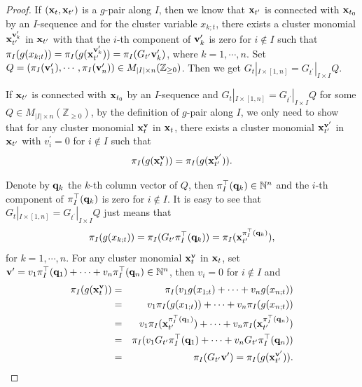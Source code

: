 \documentclass[14pt]{amsart}
\begin{document}
\begin{proof}

If $({\bf x}_t,{\bf x}_{t^\prime})$ is a $g$-pair along $I$, then we know that  ${\bf x}_{t^\prime}$ is connected with ${\bf x}_{t_0}$ by an $I$-sequence and
for the cluster variable $x_{k;t}$, there exists a cluster monomial ${\bf x}_{t^{\prime}}^{{\bf v}_k^{\prime}}$ in ${\bf x}_{t^{\prime}}$ with that the $i$-th component of ${\bf v}_k^{\prime}$ is zero  for $i\notin I$
  such that $\pi_I(g(x_{k;t}))=\pi_I(g({\bf x}_{t^{\prime}}^{{\bf v}_k^{\prime}}))=\pi_I(G_{t^\prime}{\bf v}_k^\prime)$, where $k=1,\cdots,n$. Set $Q=(\pi_I({\bf v}_1^\prime),\cdots,\pi_I({\bf v}_n^\prime))\in M_{|I|\times n}(\mathbb Z_{\geq 0})$.
  Then we get $G_t|_{I\times [1,n]}=G_{t^\prime}|_{I\times I}Q$.


  If ${\bf x}_{t^\prime}$ is connected with ${\bf x}_{t_0}$ by an $I$-sequence and
 $G_t|_{I\times [1,n]}=G_{t^\prime}|_{I\times I}Q$ for some $Q\in M_{|I|\times n}(\mathbb Z_{\geq 0})$, by the definition of $g$-pair along $I$, we only need to show that for any cluster monomial ${\bf x}_t^{\bf v}$ in ${\bf x}_t$, there exists a cluster monomial ${\bf x}_{t^{\prime}}^{{\bf v}^{\prime}}$ in ${\bf x}_{t^{\prime}}$ with $v_i^{\prime}=0$ for $i\notin I$
  such that
$$\pi_I(g({\bf x}_t^{\bf v}))=\pi_I(g({\bf x}_{t^{\prime}}^{{\bf v}^{\prime}})).$$



  Denote by ${\bf q}_k$ the $k$-th column vector of $Q$, then $\pi_I^\top({\bf q}_k)\in\mathbb N^n$ and the $i$-th component of $\pi_I^\top({\bf q}_k)$ is zero for $i\notin I$.
  It is easy to see that $G_t|_{I\times [1,n]}=G_{t^\prime}|_{I\times I}Q$  just means that
  $$\pi_I(g(x_{k;t}))=\pi_I(G_{t^\prime} \pi_I^\top({\bf q}_k))=\pi_I({\bf x}_{t^\prime}^{\pi_I^\top({\bf q}_k)}),$$
  for $k=1,\cdots,n$. For any cluster monomial  ${\bf x}_t^{\bf v}$ in ${\bf x}_t$, set ${\bf v}^\prime=v_1\pi_I^\top({\bf q}_1)+\cdots+v_n\pi_I^\top({\bf q}_n)\in\mathbb N^n$, then  $v_i=0$ for $i\notin I$ and
  \begin{eqnarray}
  \pi_I(g({\bf x}_t^{\bf v}))&=& \pi_I(v_1g(x_{1;t})+\cdots+v_ng(x_{n;t}))\nonumber\\
&=&v_1\pi_I(g(x_{1;t}))+\cdots+v_n\pi_I(g(x_{n;t}))\nonumber\\
&=&v_1\pi_I({\bf x}_{t^\prime}^{\pi_I^\top({\bf q}_1)})+\cdots+v_n\pi_I({\bf x}_{t^\prime}^{\pi_I^\top({\bf q}_n)})\nonumber\\
&=&\pi_I(v_1G_{t^\prime}\pi_I^\top({\bf q}_1)+\cdots+v_nG_{t^\prime}\pi_I^\top({\bf q}_n))\nonumber\\
   &=&\pi_I(G_{t^\prime}{\bf v}^{\prime})= \pi_I(g({\bf x}_{t^{\prime}}^{{\bf v}^{\prime}}))\nonumber.
\end{eqnarray}
\end{proof}
\end{document}
